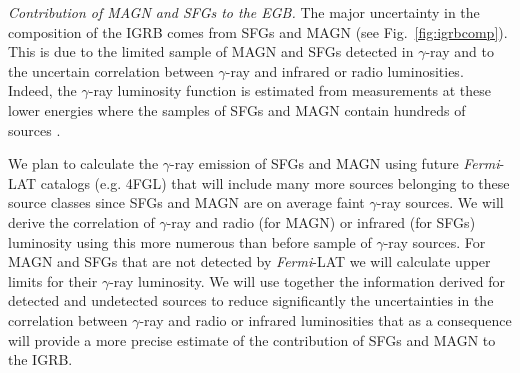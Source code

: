 \documentclass[12 pt]{article}
\begin{document}








{\it Contribution of MAGN and SFGs to the EGB.}
The major uncertainty in the composition of the IGRB comes from SFGs and MAGN \cite{DiMauro:2015tfa} (see Fig.~\ref{fig:igrbcomp}). 
This is due to the limited sample of MAGN and SFGs detected in $\gamma$-ray and to the uncertain correlation between $\gamma$-ray and infrared or radio luminosities.
Indeed, the $\gamma$-ray luminosity function is estimated from measurements at these lower energies where the samples of SFGs and MAGN contain hundreds of sources \cite{2012ApJ...755..164A,DiMauro:2013xta}.


We plan to calculate the $\gamma$-ray emission of SFGs and MAGN using future {\it Fermi}-LAT catalogs (e.g. 4FGL) that will include many more sources belonging to these source classes since SFGs and MAGN are on average faint $\gamma$-ray sources.
We will derive the correlation of $\gamma$-ray and radio (for MAGN) or infrared (for SFGs) luminosity using this more numerous than before sample of $\gamma$-ray sources.
For MAGN and SFGs that are not detected by {\it Fermi}-LAT we will calculate upper limits for their $\gamma$-ray luminosity.
We will use together the information derived for detected and undetected sources to reduce significantly the uncertainties in the correlation between $\gamma$-ray and radio or infrared luminosities that as a consequence will provide a more precise estimate of the contribution of SFGs and MAGN to the IGRB.
\end{document}
